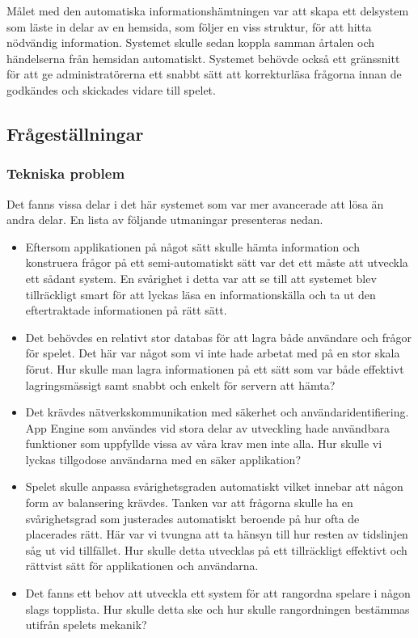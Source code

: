 \documentclass[a4paper, 11pt]{article}
\begin{document}
Målet med den automatiska informationshämtningen var att skapa ett delsystem som läste in delar av en hemsida, som följer en viss struktur, för att hitta nödvändig information. Systemet skulle sedan koppla samman årtalen och händelserna från hemsidan automatiskt. Systemet behövde också ett gränssnitt för att ge administratörerna ett snabbt sätt att korrekturläsa frågorna innan de godkändes och skickades vidare till spelet.

\subsection{Frågeställningar}

\subsubsection{Tekniska problem}
Det fanns vissa delar i det här systemet som var mer avancerade att lösa än andra delar. En lista av följande utmaningar presenteras nedan.
\begin{itemize}
\item Eftersom applikationen på något sätt skulle hämta information och konstruera frågor på ett semi-automatiskt sätt var det ett måste att utveckla ett sådant system. En svårighet i detta var att se till att systemet blev tillräckligt smart för att lyckas läsa en informationskälla och ta ut den eftertraktade informationen på rätt sätt.
\item Det behövdes en relativt stor databas för att lagra både användare och frågor för spelet. Det här var något som vi inte hade arbetat med på en stor skala förut. Hur skulle man lagra informationen på ett sätt som var både effektivt lagringsmässigt samt snabbt och enkelt för servern att hämta?
\item Det krävdes nätverkskommunikation med säkerhet och användaridentifiering. App Engine som användes vid stora delar av utveckling hade användbara funktioner som uppfyllde vissa av våra krav men inte alla. Hur skulle vi lyckas tillgodose användarna med en säker applikation?
\item Spelet skulle anpassa svårighetsgraden automatiskt vilket innebar att någon form av balansering krävdes. Tanken var att frågorna skulle ha en svårighetsgrad som justerades automatiskt beroende på hur ofta de placerades rätt. Här var vi tvungna att ta hänsyn till hur resten av tidslinjen såg ut vid tillfället. Hur skulle detta utvecklas på ett tillräckligt effektivt och rättvist sätt för applikationen och användarna.
\item Det fanns ett behov att utveckla ett system för att rangordna spelare i någon slags topplista. Hur skulle detta ske och hur skulle rangordningen bestämmas utifrån spelets mekanik? 
\end{itemize}
\end{document}
